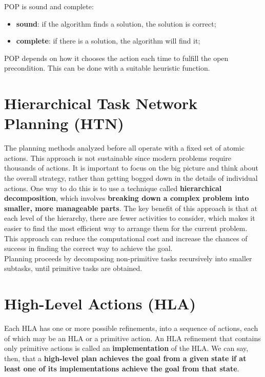 \documentclass{article}
\begin{document}
POP is sound and complete: 
\begin{itemize}
    \item \textbf{sound}: if the algorithm finds a solution, the solution is correct;
    \item \textbf{complete}: if there is a solution, the algorithm will find it;
\end{itemize}

POP depends on how it chooses the action each time to fulfill the open precondition. This can be done with a suitable heuristic function.

\newpage

\section{Hierarchical Task Network Planning (HTN)}

The planning methods analyzed before all operate with a fixed set of atomic actions. This approach is not sustainable since modern problems require thousands of actions. It is important to focus on the big picture and think about the overall strategy, rather than getting bogged down in the details of individual actions. One way to do this is to use a technique called \textbf{hierarchical decomposition}, which involves \textbf{breaking down a complex problem into smaller, more manageable parts}. The key benefit of this approach is that at each level of the hierarchy, there are fewer activities to consider, which makes it easier to find the most efficient way to arrange them for the current problem. This approach can reduce the computational cost and increase the chances of success in finding the correct way to achieve the goal. \\

Planning proceeds by decomposing non-primitive tasks recursively into smaller subtasks, until primitive tasks are obtained.

\section{High-Level Actions (HLA)}

Each HLA has one or more possible refinements, into a sequence of actions, each of which may be an HLA or a primitive action. An HLA refinement that contains only primitive actions is called an \textbf{implementation} of the
HLA. We can say, then, that a \textbf{high-level plan achieves the goal from a given state if at least
one of its implementations achieve the goal from that state}.
\end{document}
